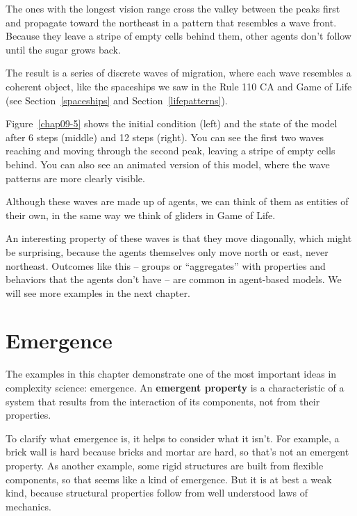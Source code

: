 \documentclass[12pt]{book}
\theoremstyle{exercise}
\begin{document}
The ones with the longest vision range cross the valley between the
peaks first and propagate toward the northeast in a pattern that
resembles a wave front.  Because they leave a stripe of empty cells
behind them, other agents don't follow until the sugar grows back.

The result is a series of discrete waves of migration, where each wave
resembles a coherent object, like the spaceships we saw in the Rule
110 CA and Game of Life (see Section~\ref{spaceships} and
Section~\ref{lifepatterns}).

Figure~\ref{chap09-5} shows the initial condition (left) and the
state of the model after 6 steps (middle) and 12 steps (right).
You can see the first two waves reaching and moving through the
second peak, leaving a stripe of empty cells behind.  You can also
see an animated version of this model, where the wave patterns are
more clearly visible.

Although these waves are made up of agents, we can think of them
as entities of their own, in the same way we think of gliders in
Game of Life.

An interesting property of these waves is that they
move diagonally, which might be surprising, because the agents
themselves only move north or east, never northeast.  Outcomes
like this -- groups or ``aggregates'' with properties and behaviors
that the agents don't have -- are common in agent-based models.
We will see more examples in the next chapter.


\section{Emergence}

The examples in this chapter demonstrate one of the most important
ideas in complexity science: emergence.  An {\bf emergent property} is
a characteristic of a system that results from the interaction of its
components, not from their properties.


To clarify what emergence is, it helps to consider what it isn't.  For
example, a brick wall is hard because bricks and mortar are hard, so
that's not an emergent property.  As another example, some rigid
structures are built from flexible components, so that seems like a
kind of emergence.  But it is at best a weak kind, because structural
properties follow from well understood laws of mechanics.

\end{document}
